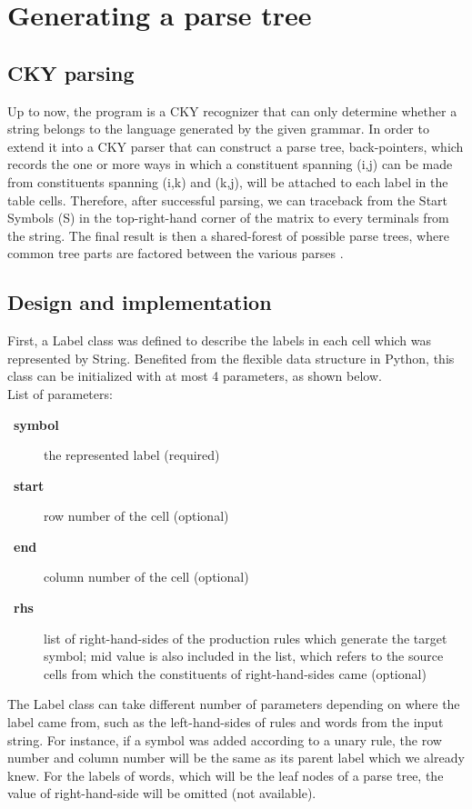 \documentclass{article}
\let\Item\item
\newcommand\SpecialItem{\renewcommand\item[1][]{\Item[\textbullet~\bfseries##1]}}
\begin{document}
\section{Generating a parse tree}

\subsection{CKY parsing}

Up to now, the program is a CKY recognizer that can only determine whether a string belongs to the language generated by the given grammar. In order to extend it into a CKY parser that can construct a parse tree, back-pointers, which records the one or more ways in which a constituent spanning (i,j) can be made from constituents spanning (i,k) and (k,j), will be attached to each label in the table cells. Therefore, after successful parsing, we can traceback from the Start Symbols (S) in the top-right-hand corner of the matrix to every terminals from the string. The final result is then a shared-forest of possible parse trees, where common tree parts are factored between the various parses \cite{lang1994recognition}.

\subsection{Design and implementation}
First, a Label class was defined to describe the labels in each cell which was represented by String. Benefited from the flexible data structure in Python, this class can be initialized with at most 4 parameters, as shown below.\\

List of parameters:

\SpecialItem
\begin{description}
	\item[symbol] the represented label (required)
	\item[start] row number of the cell (optional)
	\item[end] column number of the cell (optional)
	\item[rhs] list of right-hand-sides of the production rules which generate the target symbol; mid value is also included in the list, which refers to the source cells from which the constituents of right-hand-sides came (optional)
\end{description}

The Label class can take different number of parameters depending on where the label came from, such as the left-hand-sides of rules and words from the input string. For instance, if a symbol was added according to a unary rule, the row number and column number will be the same as its parent label which we already knew. For the labels of words, which will be the leaf nodes of a parse tree, the value of right-hand-side will be omitted (not available).
\end{document}
